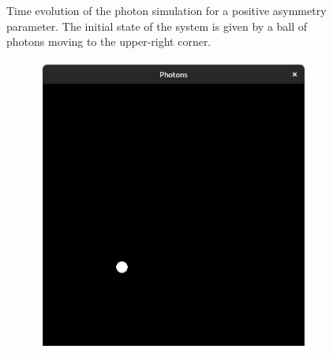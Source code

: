 \documentclass{stdlocal}
\begin{document}
\begin{figure}[p]
\begin{subfigure}[b]{0.24\textwidth}
      \end{subfigure}
      \caption[Photon Simulation Time Evolution for Positive Asymmetry Parameter]{%
        Time evolution of the photon simulation for a positive asymmetry parameter.
        The initial state of the system is given by a ball of photons moving to the upper-right corner.
      }
      \label{fig:photons-time-evolution-positive}
    \end{figure}

    \begin{figure}[p]
      \center
      \begin{subfigure}[b]{0.24\textwidth}
        \center
        \includegraphics[width=\textwidth,trim={0 0 0 2cm},clip]{images/photons_2_01.png}
      \end{subfigure}
      \begin{subfigure}[b]{0.24\textwidth}
        \center

\end{subfigure}
\end{figure}
\end{document}
